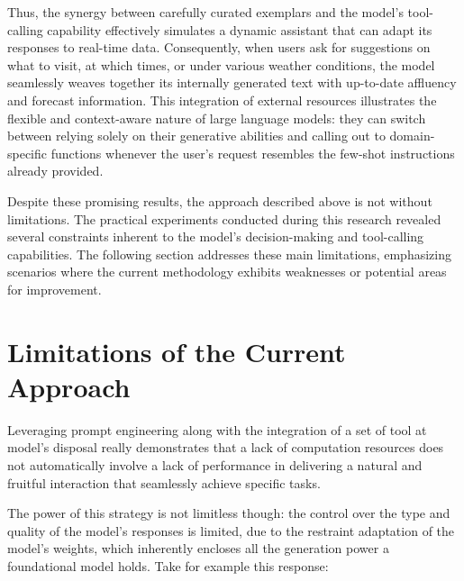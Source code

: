 Thus, the synergy between carefully curated exemplars and the model’s tool-calling capability effectively simulates a dynamic assistant that can adapt its responses to real-time data. Consequently, when users ask for suggestions on what to visit, at which times, or under various weather conditions, the model seamlessly weaves together its internally generated text with up-to-date affluency and forecast information. This integration of external resources illustrates the flexible and context-aware nature of large language models: they can switch between relying solely on their generative abilities and calling out to domain-specific functions whenever the user’s request resembles the few-shot instructions already provided.

Despite these promising results, the approach described above is not without limitations. The practical experiments conducted during this research revealed several constraints inherent to the model's decision-making and tool-calling capabilities. The following section addresses these main limitations, emphasizing scenarios where the current methodology exhibits weaknesses or potential areas for improvement.



\section{Limitations of the Current Approach}
\label{sec:limitations}

Leveraging prompt engineering along with the integration of a set of tool at model's disposal really demonstrates that a lack of computation resources does not automatically involve a lack of performance in delivering a natural and fruitful interaction that seamlessly achieve specific tasks.

The power of this strategy is not limitless though: the control over the type and quality of the model's responses is limited, due to the restraint adaptation of the model's weights, which inherently encloses all the generation power a foundational model holds. Take for example this response:

